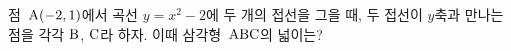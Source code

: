 점~$\mathrm{A}(-2{,}\mkern3mu\mathopen{}1)$에서 곡선 $y=x^2-2$에 두 개의 접선을 그을 때, 두 접선이 $y$축과 만나는 점을 각각 $\mathrm{B}$, $\mathrm{C}$라 하자. 이때 삼각형~$\mathrm{ABC}$의 넓이는?
